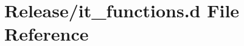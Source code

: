 \hypertarget{it__functions_8d}{}\section{Release/it\+\_\+functions.d File Reference}
\label{it__functions_8d}
